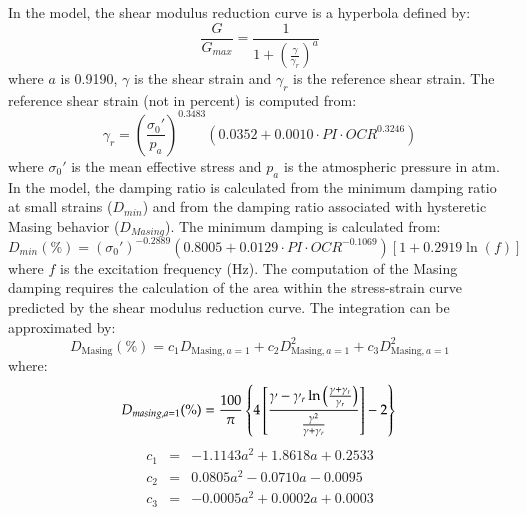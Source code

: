 \documentclass[11pt]{report}
\begin{document}
In the \citet{darendeli:01} model, the shear modulus reduction curve is a hyperbola defined by:
\begin{equation}
  \frac{G}{G_{max}} = \frac{1}{1 + \left( \frac{\gamma}{\gamma_r} \right)^{a}}
  \label{eq:shearmod}
\end{equation}
where $a$ is 0.9190, $\gamma$ is the shear strain and $\gamma_r$ is the reference shear strain.  The reference
shear strain (not in percent) is computed from:
\begin{equation}
  \gamma_r = \left(\frac{\sigma_0'}{p_a}\right)^{0.3483} \left( 0.0352 + 0.0010 \cdot PI \cdot OCR^{0.3246} \right)
\end{equation}
where $\sigma_0'$ is the mean effective stress and $p_a$ is the atmospheric pressure in atm. In the
model, the damping ratio is calculated from the minimum damping ratio at small strains ($D_{min}$)
and from the damping ratio associated with hysteretic Masing behavior ($D_{Masing}$).  The minimum
damping is calculated from:
\begin{equation}
  D_{min}(\%) = (\sigma_0')^{-0.2889} \left( 0.8005 + 0.0129 \cdot PI \cdot OCR ^{-0.1069} \right) \left[
  1 + 0.2919 \ln\left( f \right) \right]
  \label{eq:dmin}
\end{equation}
where $f$ is the excitation frequency (Hz). The computation of the Masing damping requires the
calculation of the area within the stress-strain curve predicted by the shear modulus reduction
curve.  The integration can be approximated by:
\begin{equation}
  D_\text{Masing}(\%) = c_1 D_{\text{Masing},a=1} + c_2 D_{\text{Masing},a=1}^2 + c_3
  D_{\text{Masing},a=1}^2
  \label{eq:dmasing}
\end{equation}
where:
\begin{equation}
  D_{masing,a=1}(\%) = \frac{100}{\pi} \left\{ 4 \left[ \frac{\gamma - \gamma_r\ln\left( \frac{\gamma +
  \gamma_r}{\gamma_r} \right)}{\frac{\gamma^2}{\gamma+\gamma_r}} \right] - 2 \right\} \\
\end{equation}
\begin{equation}
  \begin{array}{rcl}
	c_1 & = & -1.1143 a^2 + 1.8618 a + 0.2533 \\
	c_2 & = & 0.0805 a^2 - 0.0710 a - 0.0095 \\
	c_3 & = & -0.0005 a^2 + 0.0002 a + 0.0003 \\
  \end{array}
\end{equation}
\end{document}
